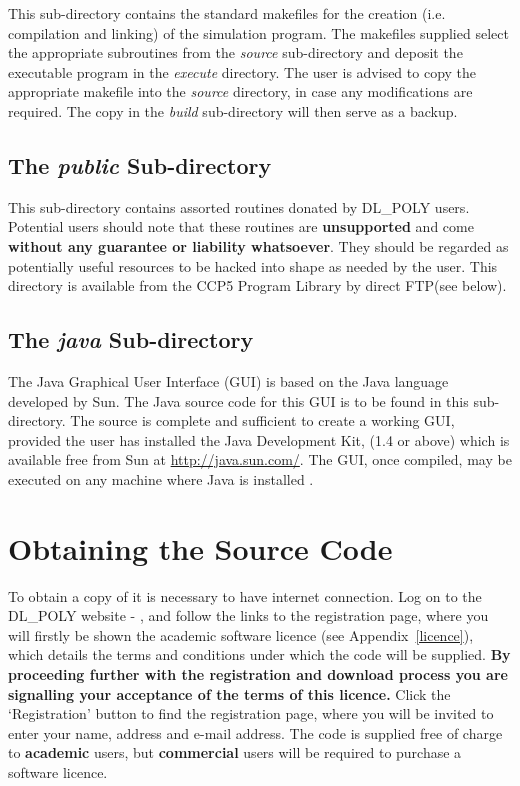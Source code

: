 This sub-directory contains the standard makefiles for the
creation (i.e. compilation and linking) of the \D simulation
program.  The makefiles supplied select the appropriate
subroutines from the {\em source} sub-directory and deposit the
executable program in the {\em execute} directory.  The user is
advised to copy the appropriate makefile into the {\em source}
directory, in case any modifications are required.  The copy in
the {\em build} sub-directory will then serve as a backup.

\subsection{The {\em public} Sub-directory}

This sub-directory contains assorted routines donated by DL\_POLY
users.  Potential users should note that these routines are {\bf
unsupported} and come {\bf without any guarantee or liability
whatsoever}.  They should be regarded as potentially useful
resources to be hacked into shape as needed by the user.  This
directory is available from the CCP5 Program Library
by direct FTP(see below).

\subsection{The {\em java} Sub-directory}

The \D Java Graphical User Interface (GUI) is based on
the Java language developed by Sun.  The Java source code for this
GUI is to be found in this sub-directory.  The source is complete
and sufficient to create a working GUI, provided the user has installed
the Java Development Kit, (1.4 or above) which is available free
from Sun at \href{http://java.sun.com/}{http://java.sun.com/}.
The GUI, once compiled, may be executed on any machine where Java
is installed \cite{smith-gui}.

\section{Obtaining the Source Code}
\label{distribution}  

To obtain a copy of \D it is necessary to have internet connection.
Log on to the DL\_POLY website - \WEB{}, and follow the
links to the \D registration page, where you will firstly be shown the
\D academic software licence (see Appendix~\ref{licence}), which details
the terms and conditions under which the code will be supplied.  {\bf By
proceeding further with the registration and download process you
are signalling your acceptance of the terms of this licence.}  Click
the `Registration' button to find the registration page, where you
will be invited to enter your name, address and e-mail address.  The
code is supplied free of charge to {\bf academic} users, but
{\bf commercial} users will be required to purchase a software licence.

